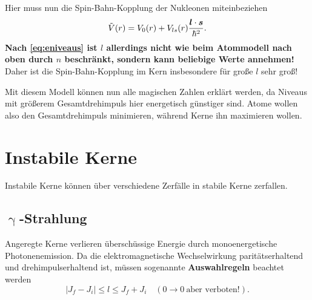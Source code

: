 Hier muss nun die Spin-Bahn-Kopplung der Nukleonen miteinbeziehen
\begin{equation*}
	\tilde{V}(r) = V_0(r) + V_{ls}(r)\frac{\boldsymbol{l}\cdot\boldsymbol{s}}{\hbar^2}.
\end{equation*}
\textbf{Nach \autoref{eq:eniveaus} ist $l$ allerdings nicht wie beim Atommodell nach oben durch $n$ beschränkt, sondern kann beliebige Werte annehmen!}
Daher ist die Spin-Bahn-Kopplung im Kern insbesondere für große $l$ sehr groß!

Mit diesem Modell können nun alle magischen Zahlen erklärt werden, da Niveaus mit größerem Gesamtdrehimpuls hier energetisch günstiger sind.
Atome wollen also den Gesamtdrehimpuls minimieren, während Kerne ihn maximieren wollen.

\section{Instabile Kerne}
Instabile Kerne können über verschiedene Zerfälle in stabile Kerne zerfallen.

\subsection{$\upgamma$-Strahlung}
Angeregte Kerne verlieren überschüssige Energie durch monoenergetische Photonenemission.
Da die elektromagnetische Wechselwirkung paritätserhaltend und drehimpulserhaltend ist, müssen sogenannte \textbf{Auswahlregeln} beachtet werden
\begin{equation*}
	|J_f-J_i|\leq l\leq J_f+ J_i\quad (0\rightarrow 0\ \text{aber verboten!}).
\end{equation*}
